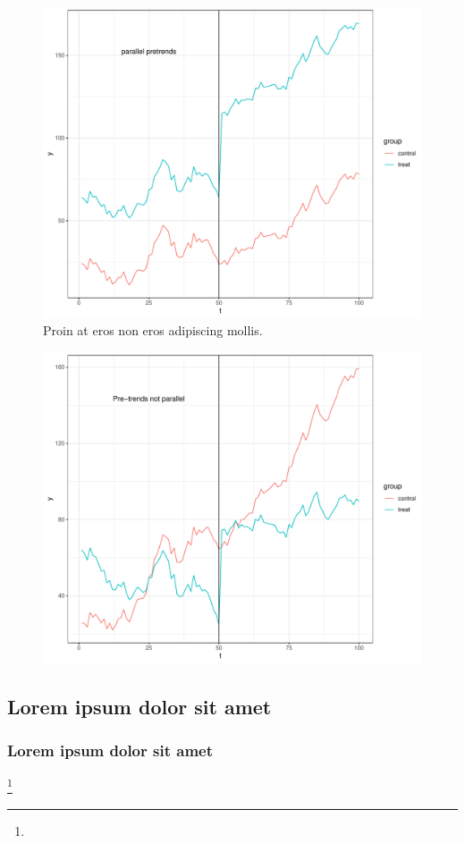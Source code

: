 \begin{figure}[H]
	\centering
	\includegraphics[width = \textwidth]{figures/fig1}
	\caption[Lorem Ipsum]{Proin at eros non eros adipiscing mollis.
		\label{fig:figura1}}
\end{figure}

\lipsum[3]

\begin{figure}[H]
	\centering
	\includegraphics[width = \textwidth]{figures/fig2}
	\caption[Lorem Ipsum]{\lipsum[4]
		\label{fig:figura2}}
\end{figure}


\lipsum[5]

\subsection{Lorem ipsum dolor sit amet}

\lipsum[6]

\subsubsection{Lorem ipsum dolor sit amet}

\lipsum[7]\footnote{\lipsum[8]}
